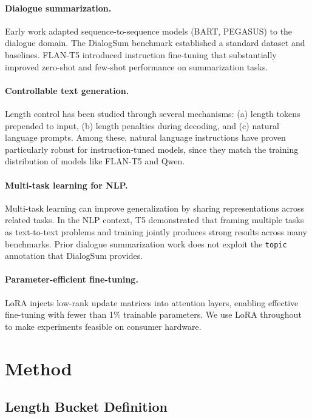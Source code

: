 \documentclass[11pt,a4paper]{article}
\begin{document}
\paragraph{Dialogue summarization.}
Early work adapted sequence-to-sequence models (BART, PEGASUS) to the dialogue domain.
The DialogSum benchmark established a standard dataset and baselines.
FLAN-T5 introduced instruction fine-tuning that substantially improved zero-shot and few-shot performance on summarization tasks.

\paragraph{Controllable text generation.}
Length control has been studied through several mechanisms: (a) length tokens prepended to input, (b) length penalties during decoding, and (c) natural language prompts.
Among these, natural language instructions have proven particularly robust for instruction-tuned models, since they match the training distribution of models like FLAN-T5 and Qwen.

\paragraph{Multi-task learning for NLP.}
Multi-task learning can improve generalization by sharing representations across related tasks.
In the NLP context, T5 demonstrated that framing multiple tasks as text-to-text problems and training jointly produces strong results across many benchmarks.
Prior dialogue summarization work does not exploit the \texttt{topic} annotation that DialogSum provides.

\paragraph{Parameter-efficient fine-tuning.}
LoRA injects low-rank update matrices into attention layers, enabling effective fine-tuning with fewer than 1\% trainable parameters.
We use LoRA throughout to make experiments feasible on consumer hardware.

\section{Method}

\subsection{Length Bucket Definition}
\end{document}
